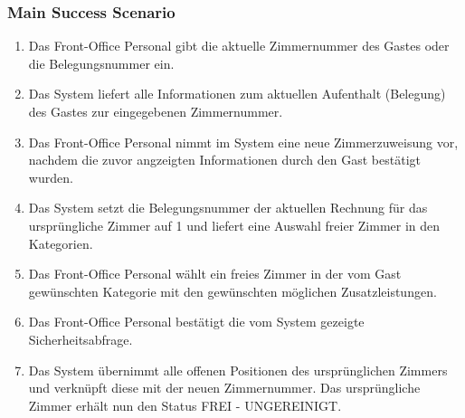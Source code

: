 \documentclass[./detailed_overview_usecases.tex]{subfiles}
\begin{document}
    \subsubsection*{Main Success Scenario}
    \begin{enumerate}
        \item Das Front-Office Personal gibt die aktuelle Zimmernummer des Gastes oder die Belegungsnummer ein.
        \item Das System liefert alle Informationen zum aktuellen Aufenthalt (Belegung) des Gastes zur eingegebenen Zimmernummer.
        \item Das Front-Office Personal nimmt im System eine neue Zimmerzuweisung vor, nachdem die zuvor angzeigten Informationen durch den Gast bestätigt wurden.
        \item Das System setzt die Belegungsnummer der aktuellen Rechnung für das ursprüngliche Zimmer auf 1 und liefert eine Auswahl freier Zimmer in den Kategorien.
        \item Das Front-Office Personal wählt ein freies Zimmer in der vom Gast gewünschten Kategorie mit den gewünschten möglichen Zusatzleistungen.
        \item Das Front-Office Personal bestätigt die vom System gezeigte Sicherheitsabfrage.
        \item Das System übernimmt alle offenen Positionen des ursprünglichen Zimmers und verknüpft diese mit der neuen Zimmernummer. Das ursprüngliche Zimmer
        erhält nun den Status FREI - UNGEREINIGT.
    \end{enumerate}
\end{document}
